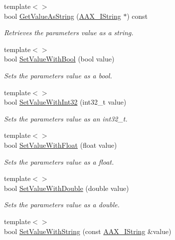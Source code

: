 \begin{DoxyCompactItemize}
{\footnotesize template$<$$>$ }\\bool \mbox{\hyperlink{a01537_af72fb87d6368888f8f97148705c0df3e}{Get\+Value\+As\+String}} (\mbox{\hyperlink{a01873}{A\+A\+X\+\_\+\+I\+String}} $\ast$) const
\begin{DoxyCompactList}\small\item\em Retrieves the parameter\textquotesingle{}s value as a string. \end{DoxyCompactList}\item 
{\footnotesize template$<$$>$ }\\bool \mbox{\hyperlink{a01537_aa741c6432107eab6bf8796833a6f2cde}{Set\+Value\+With\+Bool}} (bool value)
\begin{DoxyCompactList}\small\item\em Sets the parameter\textquotesingle{}s value as a bool. \end{DoxyCompactList}\item 
{\footnotesize template$<$$>$ }\\bool \mbox{\hyperlink{a01537_a0071856d5eafd8053126642b63a41f4f}{Set\+Value\+With\+Int32}} (int32\+\_\+t value)
\begin{DoxyCompactList}\small\item\em Sets the parameter\textquotesingle{}s value as an int32\+\_\+t. \end{DoxyCompactList}\item 
{\footnotesize template$<$$>$ }\\bool \mbox{\hyperlink{a01537_aa06c3f670310e2022c89385b354fc2c8}{Set\+Value\+With\+Float}} (float value)
\begin{DoxyCompactList}\small\item\em Sets the parameter\textquotesingle{}s value as a float. \end{DoxyCompactList}\item 
{\footnotesize template$<$$>$ }\\bool \mbox{\hyperlink{a01537_af33746072bc8c5dd950fce15f81d1e4c}{Set\+Value\+With\+Double}} (double value)
\begin{DoxyCompactList}\small\item\em Sets the parameter\textquotesingle{}s value as a double. \end{DoxyCompactList}\item 
{\footnotesize template$<$$>$ }\\bool \mbox{\hyperlink{a01537_a73d6d6e280fb970dcc7d65682ace4f73}{Set\+Value\+With\+String}} (const \mbox{\hyperlink{a01873}{A\+A\+X\+\_\+\+I\+String}} \&value)

\end{DoxyCompactItemize}
